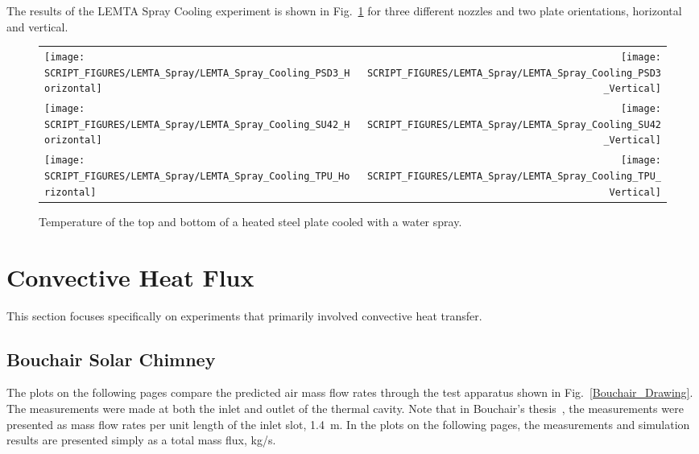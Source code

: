 The results of the LEMTA Spray Cooling experiment is shown in Fig.~\ref{LEMTA_Spray_Cooling_Fig} for three different nozzles and two plate orientations, horizontal and vertical.

\begin{figure}[h!]
\begin{tabular*}{\textwidth}{l@{\extracolsep{\fill}}r}
\texttt{[image: SCRIPT\_FIGURES/LEMTA\_Spray/LEMTA\_Spray\_Cooling\_PSD3\_Horizontal]} &
\texttt{[image: SCRIPT\_FIGURES/LEMTA\_Spray/LEMTA\_Spray\_Cooling\_PSD3\_Vertical]} \\
\texttt{[image: SCRIPT\_FIGURES/LEMTA\_Spray/LEMTA\_Spray\_Cooling\_SU42\_Horizontal]} &
\texttt{[image: SCRIPT\_FIGURES/LEMTA\_Spray/LEMTA\_Spray\_Cooling\_SU42\_Vertical]} \\
\texttt{[image: SCRIPT\_FIGURES/LEMTA\_Spray/LEMTA\_Spray\_Cooling\_TPU\_Horizontal]} &
\texttt{[image: SCRIPT\_FIGURES/LEMTA\_Spray/LEMTA\_Spray\_Cooling\_TPU\_Vertical]}
\end{tabular*}
\caption[LEMTA Spray Cooling steel plate temperatures]{Temperature of the top and bottom of a heated steel plate cooled with a water spray.}
\label{LEMTA_Spray_Cooling_Fig}
\end{figure}


\clearpage

\section{Convective Heat Flux}

This section focuses specifically on experiments that primarily involved convective heat transfer.

\subsection{Bouchair Solar Chimney}

The plots on the following pages compare the predicted air mass flow rates through the test apparatus shown in Fig.~\ref{Bouchair_Drawing}. The measurements were made at both the inlet and outlet of the thermal cavity. Note that in Bouchair's thesis~\cite{Bouchair:Thesis}, the measurements were presented as mass flow rates per unit length of the inlet slot, 1.4~m. In the plots on the following pages, the measurements and simulation results are presented simply as a total mass flux, kg/s.

